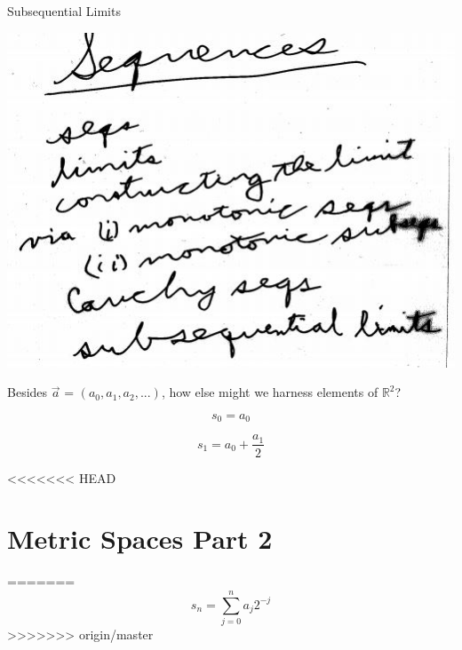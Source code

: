 \documentclass[10pt,a4paper]{article}
\begin{document}
{{Subsequential Limits 

\includegraphics[scale=.8]{Pages/S&L_page1}

\newpage


Besides $\vec{a}$ = $(a{_0}, a_{1}, a_{2}, ...)$, how else might we harness elements of $\mathbb {R}^{2}$?

$$s_0 = a_{0}$$

$$s_1 = a_{0} + \frac{a_{1}}{2}$$



<<<<<<< HEAD
\section{Metric Spaces Part 2} 
=======
$$s_{n} = \sum_{j=0}^{n} a_{j} 2^{-j}$$
>>>>>>> origin/master



}}
\end{document}
